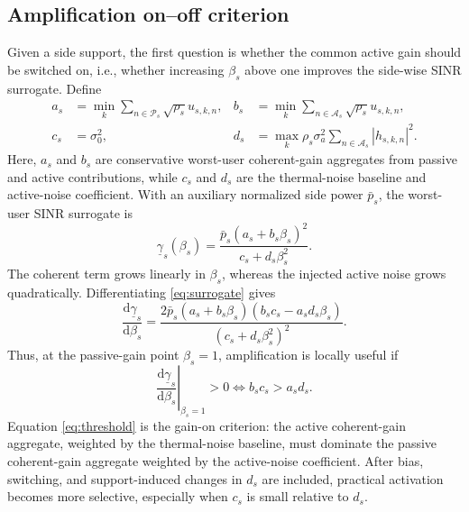 \documentclass[journal]{IEEEtran}
\begin{document}
\subsection{Amplification on--off criterion}
Given a side support, the first question is whether the common active gain should be switched on, i.e., whether increasing $\beta_s$ above one improves the side-wise SINR surrogate. Define
\begin{equation}
\begin{aligned}
a_s &= \min_k \sum_{n\in\mathcal{P}_s}\sqrt{\rho_s}u_{s,k,n},&
b_s &= \min_k \sum_{n\in\mathcal{A}_s}\sqrt{\rho_s}u_{s,k,n},\\
c_s &= \sigma_0^2,&
d_s &= \max_k \rho_s\sigma_a^2\sum_{n\in\mathcal{A}_s}|h_{s,k,n}|^2 .
\end{aligned}
\label{eq:abcd}
\end{equation}
Here, $a_s$ and $b_s$ are conservative worst-user coherent-gain aggregates from passive and active contributions, while $c_s$ and $d_s$ are the thermal-noise baseline and active-noise coefficient. With an auxiliary normalized side power $\bar p_s$, the worst-user SINR surrogate is
\begin{equation}
\underline{\gamma}_s(\beta_s)=
\frac{\bar{p}_s(a_s+b_s\beta_s)^2}{c_s+d_s\beta_s^2}.
\label{eq:surrogate}
\end{equation}
The coherent term grows linearly in $\beta_s$, whereas the injected active noise grows quadratically. Differentiating \eqref{eq:surrogate} gives
\begin{equation}
\frac{\mathrm{d}\underline{\gamma}_s}{\mathrm{d}\beta_s}=
\frac{2\bar{p}_s(a_s+b_s\beta_s)(b_sc_s-a_sd_s\beta_s)}{(c_s+d_s\beta_s^2)^2}.
\label{eq:surrogate_derivative}
\end{equation}
Thus, at the passive-gain point $\beta_s=1$, amplification is locally useful if
\begin{equation}
\left.\frac{\mathrm{d}\underline{\gamma}_s}{\mathrm{d}\beta_s}\right|_{\beta_s=1}>0
\iff b_sc_s>a_sd_s.
\label{eq:threshold}
\end{equation}
Equation \eqref{eq:threshold} is the gain-on criterion: the active coherent-gain aggregate, weighted by the thermal-noise baseline, must dominate the passive coherent-gain aggregate weighted by the active-noise coefficient. After bias, switching, and support-induced changes in $d_s$ are included, practical activation becomes more selective, especially when $c_s$ is small relative to $d_s$.
\end{document}
